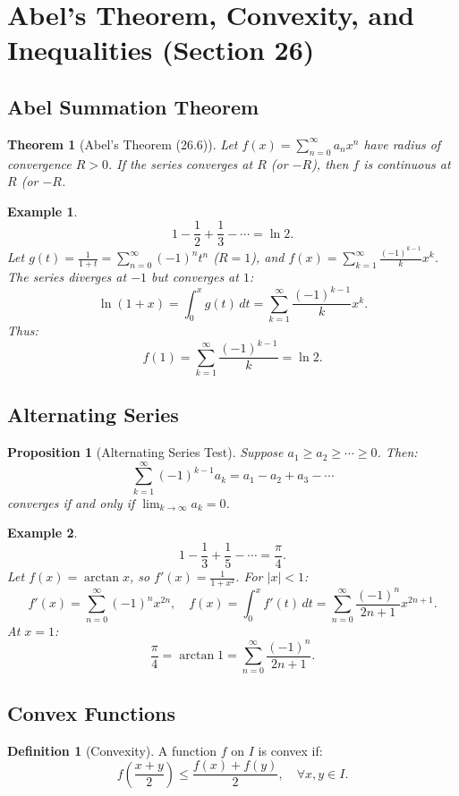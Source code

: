 \documentclass[9pt]{article}
\theoremstyle{definition}
\newtheorem{definition}{Definition}
\theoremstyle{plain}
\newtheorem{theorem}{Theorem}
\newtheorem{proposition}{Proposition}
\newtheorem{example}{Example}
\begin{document}
\section*{Abel’s Theorem, Convexity, and Inequalities (Section 26)}

\subsection*{Abel Summation Theorem}
\begin{theorem}[Abel’s Theorem (26.6)]
Let \( f(x) = \sum_{n=0}^\infty a_n x^n \) have radius of convergence \( R > 0 \). If the series converges at \( R \) (or \( -R \)), then \( f \) is continuous at \( R \) (or \( -R \).
\end{theorem}

\begin{example}
\[
1 - \frac{1}{2} + \frac{1}{3} - \cdots = \ln 2.
\]
Let \( g(t) = \frac{1}{1+t} = \sum_{n=0}^\infty (-1)^n t^n \) (\( R = 1 \)), and \( f(x) = \sum_{k=1}^\infty \frac{(-1)^{k-1}}{k} x^k \). The series diverges at \( -1 \) but converges at \( 1 \):
\[
\ln(1+x) = \int_0^x g(t) \, dt = \sum_{k=1}^\infty \frac{(-1)^{k-1}}{k} x^k.
\]
Thus:
\[
f(1) = \sum_{k=1}^\infty \frac{(-1)^{k-1}}{k} = \ln 2.
\]
\end{example}

\subsection*{Alternating Series}
\begin{proposition}[Alternating Series Test]
Suppose \( a_1 \geq a_2 \geq \cdots \geq 0 \). Then:
\[
\sum_{k=1}^\infty (-1)^{k-1} a_k = a_1 - a_2 + a_3 - \cdots
\]
converges if and only if \( \lim_{k \to \infty} a_k = 0 \).
\end{proposition}

\begin{example}
\[
1 - \frac{1}{3} + \frac{1}{5} - \cdots = \frac{\pi}{4}.
\]
Let \( f(x) = \arctan x \), so \( f'(x) = \frac{1}{1+x^2} \). For \( |x| < 1 \):
\[
f'(x) = \sum_{n=0}^\infty (-1)^n x^{2n}, \quad f(x) = \int_0^x f'(t) \, dt = \sum_{n=0}^\infty \frac{(-1)^n}{2n+1} x^{2n+1}.
\]
At \( x = 1 \):
\[
\frac{\pi}{4} = \arctan 1 = \sum_{n=0}^\infty \frac{(-1)^n}{2n+1}.
\]
\end{example}

\subsection*{Convex Functions}
\begin{definition}[Convexity]
A function \( f \) on \( I \) is convex if:
\[
f\left(\frac{x+y}{2}\right) \leq \frac{f(x) + f(y)}{2}, \quad \forall x, y \in I.
\]
\end{definition}
\end{document}
